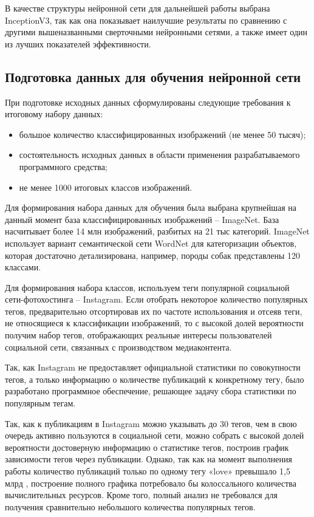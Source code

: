 
В качестве структуры нейронной сети для дальнейшей работы выбрана InceptionV3, так как она показывает наилучшие результаты по сравнению с другими вышеназванными сверточными нейронными сетями, а также имеет один из лучших показателей эффективности.

\subsection{Подготовка данных для обучения нейронной сети}
При подготовке исходных данных сформулированы следующие требования к итоговому набору данных:
\begin{itemize}
  \item большое количество классифицированных изображений (не менее 50 тысяч);
  \item состоятельность исходных данных в области применения разрабатываемого программного средства;
  \item не менее 1000 итоговых классов изображений.
\end{itemize}

Для формирования набора данных для обучения была выбрана крупнейшая на данный момент база классифицированных изображений – ImageNet. 
База насчитывает более 14 млн изображений, разбитых на 21 тыс категорий. 
ImageNet использует вариант семантической сети WordNet для категоризации объектов, которая достаточно детализирована, например, породы собак представлены 120 классами.

Для формирования набора классов, используем теги популярной социальной сети-фотохостинга – Instagram. 
Если отобрать некоторое количество популярных тегов, предварительно отсортировав их по частоте использования и отсеяв теги, не относящиеся к классификации изображений, то с высокой долей вероятности получим набор тегов, отображающих реальные интересы пользователей социальной сети, связанных с производством медиаконтента.

Так, как Instagram не предоставляет официальной статистики по совокупности тегов, а только информацию о количестве публикаций к конкретному тегу, было разработано программное обеспечение, решающее задачу сбора статистики по популярным тегам.

Так, как к публикациям в Instagram можно указывать до 30 тегов, чем в свою очередь активно пользуются в социальной сети, можно собрать с высокой долей вероятности достоверную информацию о статистике тегов, построив график зависимости тегов через публикации. 
Однако, так как на момент выполнения работы количество публикаций только по одному тегу «love» превышало 1,5 млрд \cite{love}, построение полного графика потребовало бы колоссального количества вычислительных ресурсов. Кроме того, полный анализ не требовался для получения сравнительно небольшого количества популярных тегов.

